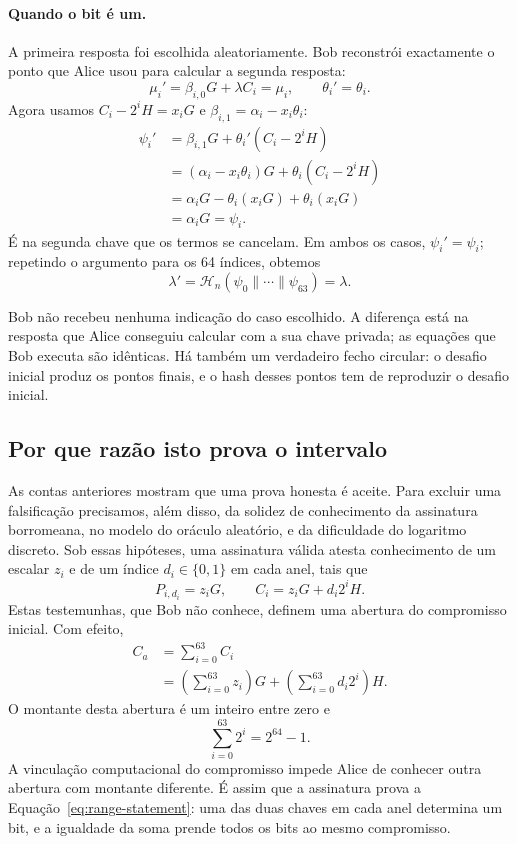 \paragraph{Quando o bit é um.}
A primeira resposta foi escolhida aleatoriamente. Bob reconstrói exactamente
o ponto que Alice usou para calcular a segunda resposta:
\[
 \mu_i'=\beta_{i,0}G+\lambda C_i=\mu_i,
 \qquad \theta_i'=\theta_i.
\]
Agora usamos \(C_i-2^iH=x_iG\) e
\(\beta_{i,1}=\alpha_i-x_i\theta_i\):
\begin{align*}
 \psi_i'
   &=\beta_{i,1}G+\theta_i'(C_i-2^iH)\\
   &=(\alpha_i-x_i\theta_i)G+\theta_i(C_i-2^iH)\\
   &=\alpha_iG-\theta_i(x_iG)+\theta_i(x_iG)\\
   &=\alpha_iG=\psi_i.
\end{align*}
É na segunda chave que os termos se cancelam. Em ambos os casos,
\(\psi_i'=\psi_i\); repetindo o argumento para os 64 índices, obtemos
\[
 \lambda'
  =\mathcal H_n(\psi_0\mathbin\|\cdots\mathbin\|\psi_{63})
  =\lambda.
\]

Bob não recebeu nenhuma indicação do caso escolhido. A diferença está na
resposta que Alice conseguiu calcular com a sua chave privada; as equações
que Bob executa são idênticas. Há também um verdadeiro fecho circular: o
desafio inicial produz os pontos finais, e o hash desses pontos tem de
reproduzir o desafio inicial.

\subsection{Por que razão isto prova o intervalo}

As contas anteriores mostram que uma prova honesta é aceite. Para excluir
uma falsificação precisamos, além disso, da solidez de conhecimento da
assinatura borromeana, no modelo do oráculo aleatório, e da dificuldade do
logaritmo discreto. Sob essas hipóteses, uma assinatura válida atesta
conhecimento de um escalar \(z_i\) e de um índice \(d_i\in\{0,1\}\) em cada
anel, tais que
\[
 P_{i,d_i}=z_iG,
 \qquad C_i=z_iG+d_i2^iH.
\]
Estas testemunhas, que Bob não conhece, definem uma abertura do compromisso
inicial. Com efeito,
\begin{align*}
 C_a
   &=\sum_{i=0}^{63}C_i\\
   &=\left(\sum_{i=0}^{63}z_i\right)G
     +\left(\sum_{i=0}^{63}d_i2^i\right)H.
\end{align*}
O montante desta abertura é um inteiro entre zero e
\[
 \sum_{i=0}^{63}2^i=2^{64}-1.
\]
A vinculação computacional do compromisso impede Alice de conhecer outra
abertura com montante diferente. É assim que a assinatura prova a
Equação~\eqref{eq:range-statement}: uma das duas chaves em cada anel determina
um bit, e a igualdade da soma prende todos os bits ao mesmo compromisso.

